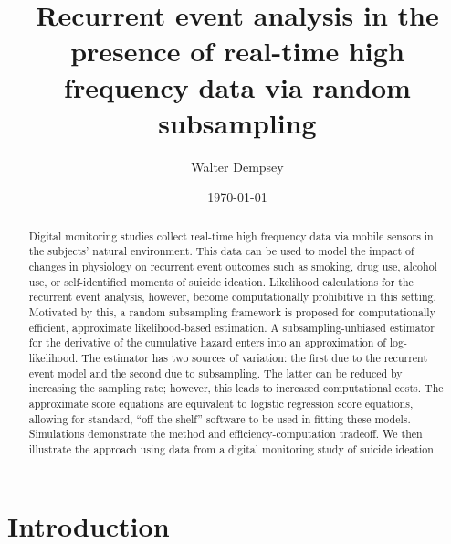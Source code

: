 \documentclass[12pt]{amsart}
\begin{document}
\title[Recurrent event analysis with functional covariates via random
subsampling]{Recurrent event analysis in the presence of real-time
  high frequency data via random subsampling}
\author{Walter Dempsey}
\address {Department of Statistics, 
  Harvard University, One Oxford Street
   Cambridge, MA  02138, USA}

\date{\today}

\begin{abstract}
Digital monitoring studies collect real-time high frequency data via
mobile sensors in the subjects' natural environment.  
This data can be used to model the impact of changes in physiology on
recurrent event outcomes such as smoking, drug use, alcohol use, or
self-identified moments of suicide ideation. 
Likelihood calculations for the recurrent event analysis, however,
become computationally prohibitive in this setting.  
Motivated by this, a random subsampling framework is proposed for
computationally efficient, approximate likelihood-based estimation.
A subsampling-unbiased estimator for the derivative of the cumulative
hazard enters into an approximation of log-likelihood. The estimator
has two sources of variation: the first due to the recurrent event
model and the second due to subsampling. The latter can be reduced by
increasing the sampling rate; however, this leads to increased
computational costs.  The approximate score equations are equivalent
to logistic regression score equations, allowing for standard,
``off-the-shelf'' software to be used in fitting these models.
Simulations demonstrate the method and efficiency-computation
tradeoff. We then illustrate the approach using data from a digital
monitoring study of suicide ideation.
\end{abstract}



\maketitle

\section{Introduction}
\end{document}
